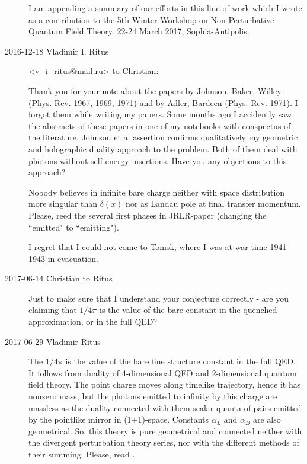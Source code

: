 \begin{description}
I am appending a summary of our efforts in this line of work
which I wrote as a contribution to the 5th Winter Workshop on
Non-Perturbative Quantum Field Theory. 22-24 March 2017,
Sophia-Antipolis.

\item[2016-12-18 Vladimir I. Ritus] <v\_i\_ritus@mail.ru>
to Christian:

Thank you for your note about the papers by Johnson, Baker, Willey (Phys.
Rev. 1967, 1969, 1971) and by Adler, Bardeen (Phys. Rev. 1971).
I forgot them while writing my papers. Some months
ago I accidently saw  the abstracts of these papers in one of my
notebooks  with conspectus of the literature. Johnson et al assertion
confirms qualitatively my geometric and holographic duality approach to
the problem. Both of them deal with photons without self-energy
insertions. Have you any objections to this approach?

Nobody believes in infinite bare charge neither with space distribution
more singular than $\delta(x)$ nor as Landau pole at final transfer
momentum. Please, reed the several first phases in JRLR-paper (changing
the ``emitted"  to ``emitting").

I regret that I could not come to Tomsk, where I was at war time
1941-1943 in evacuation.

\item[2017-06-14 Christian to Ritus]
Just to make sure that I understand your conjecture correctly - are you
claiming that $1/4\pi$ is the value of the bare constant in the quenched
approximation, or in the full QED?

\item[2017-06-29 Vladimir Ritus]
The $1/4\pi$  is the value of the bare fine structure constant in the
full QED. It follows from duality of 4-dimensional QED and 2-dimensional
quantum field theory. The point charge moves  along timelike trajectory,
hence it has nonzero mass, but the photons emitted to infinity by this
charge are massless as the duality connected with them scalar quanta of
pairs emitted by the pointlike mirror in (1+1)-space. Constants
$\alpha_L$ and $\alpha_B$ are also geometrical. So, this theory is pure
geometrical and connected neither with the divergent perturbation theory
series, nor with the different methods of their summing. Please, read
.




\end{description}

